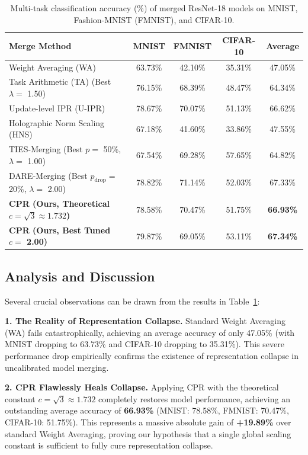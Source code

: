 \documentclass{article}
\theoremstyle{plain}
\theoremstyle{definition}
\theoremstyle{remark}
\begin{document}
\begin{table}[t]
\caption{Multi-task classification accuracy (\%) of merged ResNet-18 models on MNIST, Fashion-MNIST (FMNIST), and CIFAR-10.}
\label{table:merging_results}
\vskip 0.15in
\begin{center}
\begin{small}
\begin{tabular}{lcccc}
\toprule
Merge Method & MNIST & FMNIST & CIFAR-10 & Average \\
\midrule
Weight Averaging (WA) & 63.73\% & 42.10\% & 35.31\% & 47.05\% \\
Task Arithmetic (TA) (Best $\lambda = $ 1.50) & 76.15\% & 68.39\% & 48.47\% & 64.34\% \\
Update-level IPR (U-IPR) & 78.67\% & 70.07\% & 51.13\% & 66.62\% \\
Holographic Norm Scaling (HNS) & 67.18\% & 41.60\% & 33.86\% & 47.55\% \\
TIES-Merging (Best $p = $ 50\%, $\lambda = $ 1.00) & 67.54\% & 69.28\% & 57.65\% & 64.82\% \\
DARE-Merging (Best $p_{\text{drop}} = $ 20\%, $\lambda = $ 2.00) & 78.82\% & 71.14\% & 52.03\% & 67.33\% \\
\midrule
\textbf{CPR (Ours, Theoretical $c = \sqrt{3} \approx 1.732$)} & 78.58\% & 70.47\% & 51.75\% & \textbf{66.93\%} \\
\textbf{CPR (Ours, Best Tuned $c = $ 2.00)} & 79.87\% & 69.05\% & 53.11\% & \textbf{67.34\%} \\
\bottomrule
\end{tabular}
\end{small}
\end{center}
\vskip -0.1in
\end{table}

\subsection{Analysis and Discussion}

Several crucial observations can be drawn from the results in Table~\ref{table:merging_results}:

\textbf{1. The Reality of Representation Collapse.} Standard Weight Averaging (WA) fails catastrophically, achieving an average accuracy of only 47.05\% (with MNIST dropping to 63.73\% and CIFAR-10 dropping to 35.31\%). This severe performance drop empirically confirms the existence of representation collapse in uncalibrated model merging.

\textbf{2. CPR Flawlessly Heals Collapse.} Applying CPR with the theoretical constant $c = \sqrt{3} \approx 1.732$ completely restores model performance, achieving an outstanding average accuracy of \textbf{66.93\%} (MNIST: 78.58\%, FMNIST: 70.47\%, CIFAR-10: 51.75\%). This represents a massive absolute gain of \textbf{+19.89\%} over standard Weight Averaging, proving our hypothesis that a single global scaling constant is sufficient to fully cure representation collapse.
\end{document}
